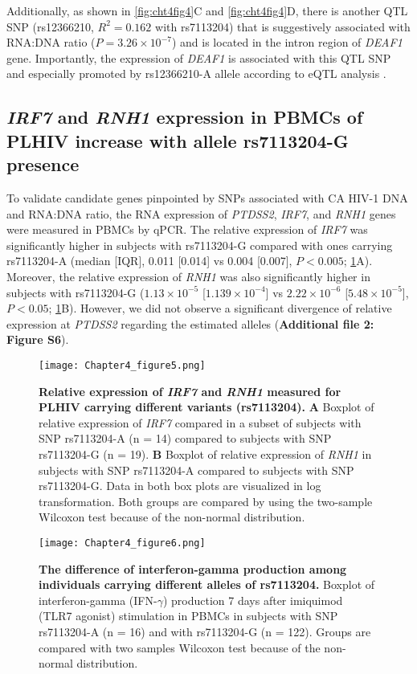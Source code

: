 \documentclass{book}
\begin{document}
\begin{refsection}
Additionally, as shown in \ref{fig:cht4fig4}C and \ref{fig:cht4fig4}D, there is another QTL SNP (rs12366210, $R^2 = 0.162$ with rs7113204) that is suggestively associated with RNA:DNA ratio ($P = 3.26 \times 10^{-7}$) and is located in the intron region of \textit{DEAF1} gene.
Importantly, the expression of \textit{DEAF1} is associated with this QTL SNP and especially promoted by rs12366210-A allele according to eQTL analysis \cite{Võsa2018Unraveling}.

\subsection*{\textit{IRF7} and \textit{RNH1} expression in PBMCs of PLHIV increase with allele rs7113204-G presence}
To validate candidate genes pinpointed by SNPs associated with CA HIV-1 DNA and RNA:DNA ratio, the RNA expression of \textit{PTDSS2}, \textit{IRF7}, and \textit{RNH1} genes were measured in PBMCs by qPCR.
The relative expression of \textit{IRF7} was significantly higher in subjects with rs7113204-G compared with ones carrying rs7113204-A (median [IQR], 0.011 [0.014] vs 0.004 [0.007], $P < 0.005$; \ref{fig:cht4fig5}A).
Moreover, the relative expression of \textit{RNH1} was also significantly higher in subjects with rs7113204-G ($1.13 \times 10^{-5}$ [$1.139 \times 10^{-4}$] vs $2.22 \times 10^{-6}$ [$5.48 \times 10^{-5}$], $P < 0.05$; \ref{fig:cht4fig5}B).
However, we did not observe a significant divergence of relative expression at \textit{PTDSS2} regarding the estimated alleles (\textbf{Additional file 2: Figure S6}).

\begin{figure}[!hbt]
  \texttt{[image: Chapter4\_figure5.png]}
  \caption{
    \label{fig:cht4fig5} \textbf{Relative expression of \textit{IRF7} and \textit{RNH1} measured for PLHIV carrying different variants (rs7113204).}
    \textbf{A} Boxplot of relative expression of \textit{IRF7} compared in a subset of subjects with SNP rs7113204-A (n = 14) compared to subjects with SNP rs7113204-G (n = 19).
    \textbf{B} Boxplot of relative expression of \textit{RNH1} in subjects with SNP rs7113204-A compared to subjects with SNP rs7113204-G. Data in both box plots are visualized in log transformation. Both groups are compared by using the two-sample Wilcoxon test because of the non-normal distribution.
  }
\end{figure}

\begin{figure}[!hbt]
  \centering
  \texttt{[image: Chapter4\_figure6.png]}
  \caption{
    \label{fig:cht4fig6} \textbf{The difference of interferon-gamma production among individuals carrying different alleles of rs7113204.}
    Boxplot of interferon-gamma (IFN-$\gamma$) production 7 days after imiquimod (TLR7 agonist) stimulation in PBMCs in subjects with SNP rs7113204-A (n = 16) and with rs7113204-G (n = 122). Groups are compared with two samples Wilcoxon test because of the non-normal distribution.
  }
\end{figure}


\end{refsection}
\end{document}
